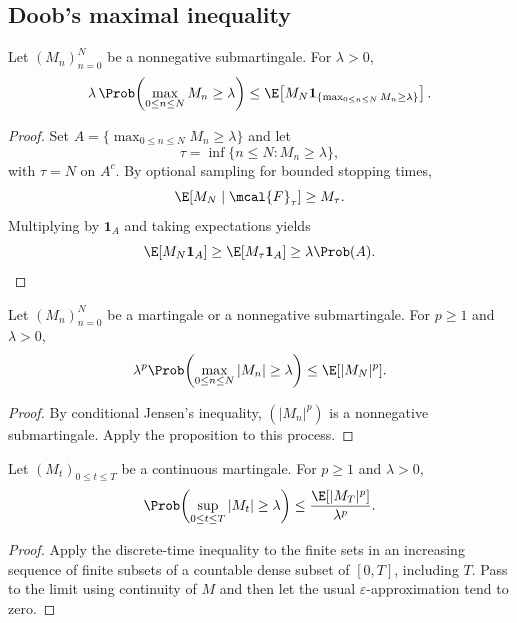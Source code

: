 \subsection*{Doob's maximal inequality}
\begin{proposition}
Let $(M_n)_{n=0}^N$ be a nonnegative submartingale. For $\lambda>0$,
\[
  \lambda\,\Prob\!\left(\max_{0\le n\le N}M_n\ge\lambda\right)
  \le \E\!\left[M_N\mathbf{1}_{\{\max_{0\le n\le N}M_n\ge\lambda\}}\right].
\]
\end{proposition}
\begin{proof}
Set $A=\{\max_{0\le n\le N}M_n\ge\lambda\}$ and let
\[
  \tau=\inf\{n\le N:M_n\ge\lambda\},
\]
with $\tau=N$ on $A^c$. By optional sampling for bounded stopping times,
\[
 \E[M_N\mid\mcal{F}_\tau]\ge M_\tau.
\]
Multiplying by $\mathbf{1}_A$ and taking expectations yields
\[
 \E[M_N\mathbf{1}_A]\ge\E[M_\tau\mathbf{1}_A]
 \ge\lambda\Prob(A).
\]
\end{proof}

\begin{corollary}
Let $(M_n)_{n=0}^N$ be a martingale or a nonnegative submartingale. For
$p\ge1$ and $\lambda>0$,
\[
 \lambda^p\Prob\!\left(\max_{0\le n\le N}|M_n|\ge\lambda\right)
 \le \E[|M_N|^p].
\]
\end{corollary}
\begin{proof}
By conditional Jensen's inequality, $(|M_n|^p)$ is a nonnegative
submartingale. Apply the proposition to this process.
\end{proof}

\begin{theorem}
Let $(M_t)_{0\le t\le T}$ be a continuous martingale. For $p\ge1$ and
$\lambda>0$,
\[
 \Prob\!\left(\sup_{0\le t\le T}|M_t|\ge\lambda\right)
 \le \frac{\E[|M_T|^p]}{\lambda^p}.
\]
\end{theorem}
\begin{proof}
Apply the discrete-time inequality to the finite sets in an increasing
sequence of finite subsets of a countable dense subset of $[0,T]$, including
$T$. Pass to the limit using continuity of $M$ and then let the usual
$\varepsilon$-approximation tend to zero.
\end{proof}

